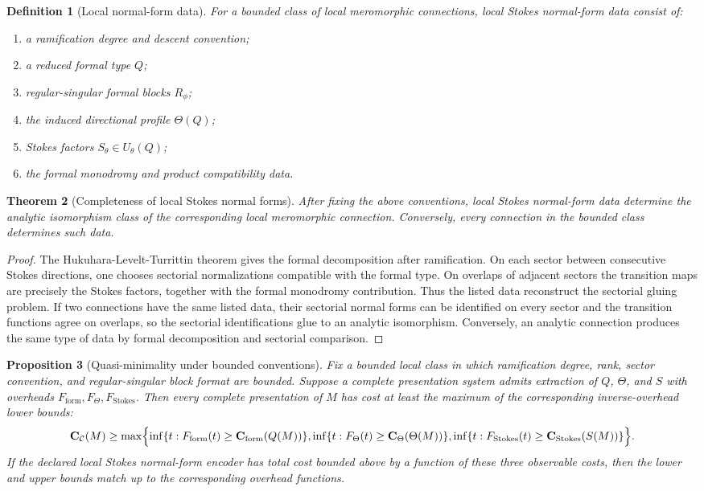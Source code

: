 \documentclass[11pt]{article}
\newtheorem{theorem}{Theorem}[section]
\newtheorem{proposition}[theorem]{Proposition}
\newtheorem{definition}[theorem]{Definition}
\begin{document}
\begin{definition}[Local normal-form data]
For a bounded class of local meromorphic connections, local Stokes normal-form data consist of:
\begin{enumerate}[leftmargin=2em]
\item a ramification degree and descent convention;
\item a reduced formal type \(Q\);
\item regular-singular formal blocks \(R_{\phi}\);
\item the induced directional profile \(\Theta(Q)\);
\item Stokes factors \(S_{\theta}\in U_{\theta}(Q)\);
\item the formal monodromy and product compatibility data.
\end{enumerate}
\end{definition}

\begin{theorem}[Completeness of local Stokes normal forms]
After fixing the above conventions, local Stokes normal-form data determine the analytic isomorphism class of the corresponding local meromorphic connection.  Conversely, every connection in the bounded class determines such data.
\end{theorem}

\begin{proof}
The Hukuhara-Levelt-Turrittin theorem gives the formal decomposition after ramification.  On each sector between consecutive Stokes directions, one chooses sectorial normalizations compatible with the formal type.  On overlaps of adjacent sectors the transition maps are precisely the Stokes factors, together with the formal monodromy contribution.  Thus the listed data reconstruct the sectorial gluing problem.  If two connections have the same listed data, their sectorial normal forms can be identified on every sector and the transition functions agree on overlaps, so the sectorial identifications glue to an analytic isomorphism.  Conversely, an analytic connection produces the same type of data by formal decomposition and sectorial comparison.
\end{proof}

\begin{proposition}[Quasi-minimality under bounded conventions]
Fix a bounded local class in which ramification degree, rank, sector convention, and regular-singular block format are bounded.  Suppose a complete presentation system admits extraction of \(Q\), \(\Theta\), and \(S\) with overheads \(F_{\operatorname{form}},F_{\Theta},F_{\operatorname{Stokes}}\).  Then every complete presentation of \(M\) has cost at least the maximum of the corresponding inverse-overhead lower bounds:
\[
\mathbf C_{\mathcal C}(M)
\ge
\max\Bigl\{
\inf\{t:F_{\operatorname{form}}(t)\ge\mathbf C_{\operatorname{form}}(Q(M))\},
\inf\{t:F_{\Theta}(t)\ge\mathbf C_{\Theta}(\Theta(M))\},
\inf\{t:F_{\operatorname{Stokes}}(t)\ge\mathbf C_{\operatorname{Stokes}}(S(M))\}
\Bigr\}.
\]
If the declared local Stokes normal-form encoder has total cost bounded above by a function of these three observable costs, then the lower and upper bounds match up to the corresponding overhead functions.
\end{proposition}
\end{document}
